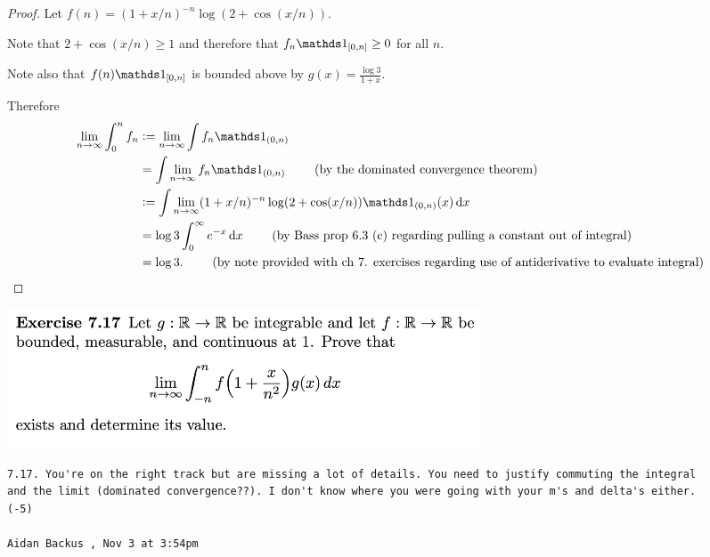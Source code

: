 \begin{proof}
  Let $f(n) = (1 + x/n)^{-n} \log(2 + \cos(x/n))$.

  Note that $2 + \cos(x/n) \geq 1$ and therefore that $f_n\ind_{[0, n]} \geq 0$ for all $n$.

  Note also that $f(n)\ind_{[0, n]}$ is bounded above by $g(x) = \frac{\log 3}{1 + x}$.

  Therefore
  \begin{align*}
    \limn \int_0^n f_n
    &:=\limn \int f_n\ind_{(0, n)}                                        \\
    &= \int \limn f_n\ind_{(0, n)}                                        ~~~~~~~ \text{(by the dominated convergence theorem)}\\
    &:= \int \limn (1 + x/n)^{-n} \log(2 + \cos(x/n))\ind_{(0, n)}(x)\dx  \\
    &= \log 3\int_0^\infty e^{-x} \dx                                     ~~~~~~~ \text{(by Bass prop 6.3 (c) regarding pulling a constant out of integral})\\
    &= \log 3.                                                           ~~~~~~~  \text{(by note provided with ch 7. exercises regarding use of antiderivative to evaluate integral)}
  \end{align*}

\end{proof}

\newpage
\begin{mdframed}
\includegraphics[width=400pt]{img/analysis--berkeley-202a-hw08-6e60.png}
\end{mdframed}

\begin{verbatim}
7.17. You're on the right track but are missing a lot of details. You need to justify commuting the integral
and the limit (dominated convergence??). I don't know where you were going with your m's and delta's either.
(-5)

Aidan Backus , Nov 3 at 3:54pm
\end{verbatim}

